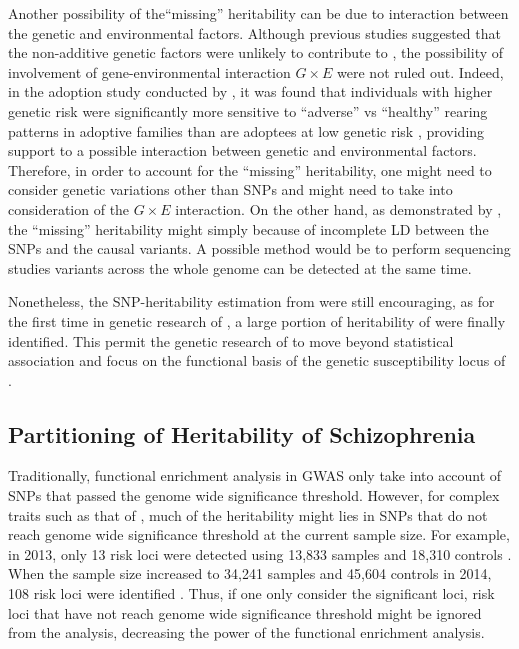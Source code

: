 	Another possibility of the``missing'' heritability can be due to interaction between the genetic and environmental factors. 
	Although previous studies \citep{Gottesman01071967} suggested that the non-additive genetic factors were unlikely to contribute to , the possibility of involvement of gene-environmental interaction $G\times E$ were not ruled out.
	Indeed, in the adoption study conducted by \citet{Tienari2004}, it was found that individuals with higher genetic risk were significantly more sensitive to ``adverse'' vs ``healthy'' rearing patterns in adoptive families than are adoptees at low genetic risk \citep{Tienari2004}, providing support to a possible interaction between genetic and environmental factors.
	Therefore, in order to account for the ``missing'' heritability, one might need to consider genetic variations other than \glspl{SNP} and might need to take into consideration of the $G\times E$ interaction.
	On the other hand, as demonstrated by \citet{Yang2010a}, the ``missing'' heritability might simply because of incomplete \gls{LD} between the \glspl{SNP} and the causal variants. 
	A possible method would be to perform sequencing studies variants across the whole genome can be detected at the same time.
	
	Nonetheless, the \gls{SNP}-heritability estimation from \citet{Ripke2014} were still encouraging, as for the first time in genetic research of , a large portion of heritability of  were finally identified.
	This permit the genetic research of  to move beyond statistical association and focus on the functional basis of the genetic susceptibility locus of .
	
	\subsection{Partitioning of Heritability of Schizophrenia}
	Traditionally, functional enrichment analysis in \gls{GWAS} only take into account of \glspl{SNP} that passed the genome wide significance threshold. 
	However, for complex traits such as that of , much of the heritability might lies in \glspl{SNP} that do not reach genome wide significance threshold at the current sample size.
	For example, in 2013, only 13 risk loci were detected using 13,833  samples and 18,310 controls \citep{Ripke2013}. 
	When the sample size increased to 34,241  samples and 45,604 controls in 2014, 108 risk loci were identified \citep{Ripke2014}. 
	Thus, if one only consider the significant loci, risk loci that have not reach genome wide significance threshold might be ignored from the analysis, decreasing the power of the functional enrichment analysis.
	
